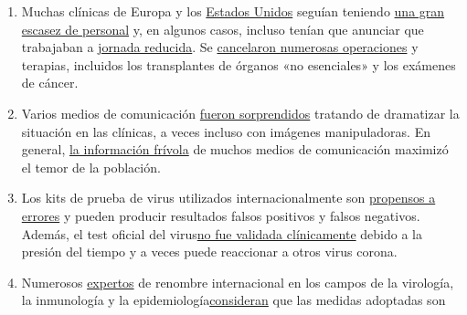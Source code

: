 \begin{enumerate}
{  existe una base científica} para la eficacia de los respiradores en
  personas sanas o asintomáticas.
  \href{https://www.aerztezeitung.de/Politik/Montgomery-haelt-Maskenpflicht-fuer-falsch-408844.html}{Más
  bien}, los expertos advierten que tales máscaras interfieren con la
  respiración y se convierten en
  «\href{https://de.sputniknews.com/interviews/20200425326953541-corona-gefahr-virologe/}{centrifugadoras
  de gérmenes}«.
\item
  Muchas clínicas de Europa y los
  \href{https://www.usatoday.com/story/news/health/2020/04/02/coronavirus-pandemic-jobs-us-health-care-workers-furloughed-laid-off/5102320002/}{Estados
  Unidos} seguían teniendo
  \href{https://www.spiegel.de/wirtschaft/unternehmen/trotz-corona-pandemie-warum-kliniken-jetzt-kurzarbeit-anmelden-a-3dc61bc9-fb12-4298-8022-bb4c2be39d7d}{una
  gran escasez de personal} y, en algunos casos, incluso tenían que
  anunciar que trabajaban a
  \href{https://www.20min.ch/schweiz/news/story/Spitaeler-28949526}{jornada
  reducida}. Se
  \href{https://www.zeit.de/2020/18/kliniken-coronavirus-intensivbetten-patienten-behandlung-notaufnahme}{cancelaron
  numerosas operaciones} y terapias, incluidos los transplantes de
  órganos «no esenciales» y los exámenes de cáncer.
\item
  Varios medios de comunicación
  \href{https://nypost.com/2020/04/01/cbs-admits-to-using-footage-from-italy-in-report-about-nyc/}{fueron
  sorprendidos} tratando de dramatizar la situación en las clínicas, a
  veces incluso con imágenes manipuladoras. En general,
  \href{https://onlinelibrary.wiley.com/doi/full/10.1111/eci.13222}{la
  información frívola} de muchos medios de comunicación maximizó el
  temor de la población.
\item
  Los kits de prueba de virus utilizados internacionalmente son
  \href{https://www.ncbi.nlm.nih.gov/pubmed/32219885}{propensos a
  errores} y pueden producir resultados falsos positivos y falsos
  negativos. Además, el test oficial del
  virus\href{https://www.ncbi.nlm.nih.gov/pubmed/32219885}{no fue
  validada clínicamente} debido a la presión del tiempo y a veces puede
  reaccionar a otros virus corona.
\item
  Numerosos
  \href{https://off-guardian.org/2020/03/24/12-experts-questioning-the-coronavirus-panic/}{expertos}
  de renombre internacional en los campos de la virología, la
  inmunología y la
  epidemiología\href{https://off-guardian.org/2020/03/28/10-more-experts-criticising-the-coronavirus-panic/}{consideran}
  que las medidas adoptadas son

\end{enumerate}
